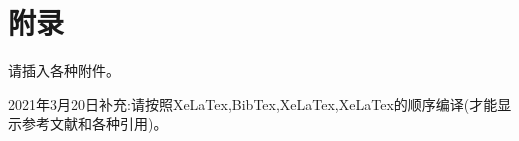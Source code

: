 \titleformat{\chapter}{\centering\sihao\hei}{\chaptername}{2em}{}
\chapter*{\centering\xiaosan\hei 附\qquad 录}
请插入各种附件。

2021年3月20日补充:请按照XeLaTex,BibTex,XeLaTex,XeLaTex的顺序编译(才能显示参考文献和各种引用)。